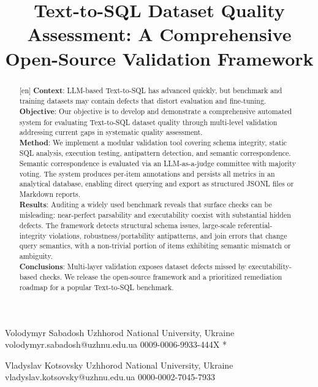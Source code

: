 \documentclass[print]{einformatica}
\begin{document}
\title{Text-to-SQL Dataset Quality Assessment: A Comprehensive Open-Source Validation Framework}



\EIauthorI
   {Volodymyr}
   {Sabadosh}
   {Uzhhorod National University, Ukraine}
   {volodymyr.sabadosh@uzhnu.edu.ua}
   {0009-0006-9933-444X}
   {*} %

\EIauthorII
   {Vladyslav}
   {Kotsovsky}
   {Uzhhorod National University, Ukraine}
   {vladyslav.kotsovsky@uzhnu.edu.ua}
   {0000-0002-7045-7933}
   {} %
 


\begin{abstract}[en]
\textbf{Context}: 
LLM-based Text-to-SQL has advanced quickly, but benchmark and training datasets may contain defects that distort evaluation and fine-tuning. \\
\textbf{Objective}: 
Our objective is to develop and demonstrate a comprehensive automated system for evaluating Text-to-SQL dataset quality through multi-level validation addressing current gaps in systematic quality assessment. \\
\textbf{Method}: 
We implement a modular validation tool covering schema integrity, static SQL analysis, execution testing, antipattern detection, and semantic correspondence. Semantic correspondence is evaluated via an LLM-as-a-judge committee with majority voting. The system produces per-item annotations and persists all metrics in an analytical database, enabling direct querying and export as structured JSONL files or Markdown reports. \\
\textbf{Results}:
Auditing a widely used benchmark reveals that surface checks can be misleading: near-perfect parsability and executability coexist with substantial hidden defects. The framework detects structural schema issues, large-scale referential-integrity violations, robustness/portability antipatterns, and join errors that change query semantics, with a non-trivial portion of items exhibiting semantic mismatch or ambiguity. \\
\textbf{Conclusions}:
Multi-layer validation exposes dataset defects missed by executability-based checks. We release the open-source framework and a prioritized remediation roadmap for a popular Text-to-SQL benchmark.
\end{abstract}
\end{document}
